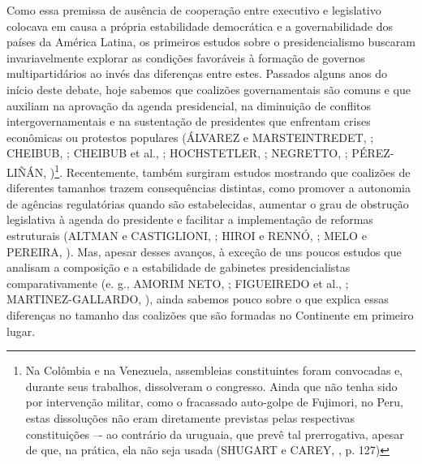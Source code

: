 Como essa premissa de ausência de cooperação entre executivo e legislativo colocava em causa a própria estabilidade democrática e a governabilidade dos países da América Latina, os primeiros estudos sobre o presidencialismo buscaram invariavelmente explorar as condições favoráveis à formação de governos multipartidários ao invés das diferenças entre estes. Passados alguns anos do início deste debate, hoje sabemos que coalizões governamentais são comuns e que auxiliam na aprovação da agenda presidencial, na diminuição de conflitos intergovernamentais e na sustentação de presidentes que enfrentam crises econômicas ou protestos populares (ÁLVAREZ e MARSTEINTREDET, \citeyear{alvarez2010}; CHEIBUB, \citeyear{cheibub2007}; CHEIBUB et al., \citeyear{cheibub2004}; HOCHSTETLER, \citeyear{hochstetler2006}; NEGRETTO, \citeyear{negretto2006}; PÉREZ-LIÑÁN, \citeyear{perez2007})\footnote{Na Colômbia e na Venezuela, assembleias constituintes foram convocadas e, durante seus trabalhos, dissolveram o congresso. Ainda que não tenha sido por intervenção militar, como o fracassado auto-golpe de Fujimori, no Peru, estas dissoluções não eram diretamente previstas pelas respectivas constituições –- ao contrário da uruguaia, que prevê tal prerrogativa, apesar de que, na prática, ela não seja usada (SHUGART e CAREY, \citeyear{shugart1992}, p. 127)}. Recentemente, também surgiram estudos mostrando que coalizões de diferentes tamanhos trazem consequências distintas, como promover a autonomia de agências regulatórias quando são estabelecidas, aumentar o grau de obstrução legislativa à agenda do presidente e facilitar a implementação de reformas estruturais (ALTMAN e CASTIGLIONI, \citeyear{altman2008}; HIROI e RENNÓ, \citeyear{hiroi2014}; MELO e PEREIRA, \citeyear{melo2013}). Mas, apesar desses avanços, à exceção de uns poucos estudos que analisam a composição e a estabilidade de gabinetes presidencialistas comparativamente (e. g., AMORIM NETO, \citeyear{neto2006}; FIGUEIREDO et al., \citeyear{figueiredo2012}; MARTINEZ-GALLARDO, \citeyear{martinez2012}), ainda sabemos pouco sobre o que explica essas diferenças no tamanho das coalizões que são formadas no Continente em primeiro lugar.

